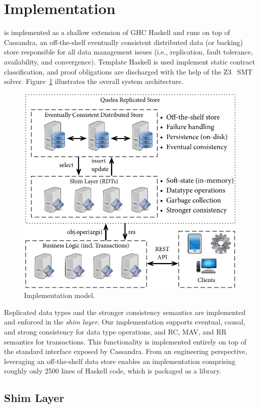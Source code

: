 \section{Implementation}
\label{q_sec:impl}

\quelea is implemented as a shallow extension of GHC Haskell and runs on top of
Cassandra, an off-the-shelf eventually consistent distributed data (or backing)
store responsible for all data management issues (i.e., replication, fault
tolerance, availability, and convergence).  Template Haskell is used implement
static contract classification, and proof obligations are discharged with the
help of the Z3~\cite{Z3} SMT solver. Figure~\ref{fig:impl_mod} illustrates the
overall system architecture.

\begin{figure}
\begin{center}
\includegraphics[width=0.7\columnwidth]{Figures/ImplModel}
\end{center}
\caption{Implementation model.}
\label{fig:impl_mod}
\end{figure}

Replicated data types and the stronger consistency semantics are implemented
and enforced in the \emph{shim layer}. Our implementation supports eventual,
causal, and strong consistency for data type operations, and RC, MAV, and RR
semantics for transactions.  This functionality is implemented entirely on top
of the standard interface exposed by Cassandra. From an engineering
perspective, leveraging an off-the-shelf data store enables an implementation
comprising roughly only 2500 lines of Haskell code, which is packaged as a
library.

\subsection{Shim Layer}

